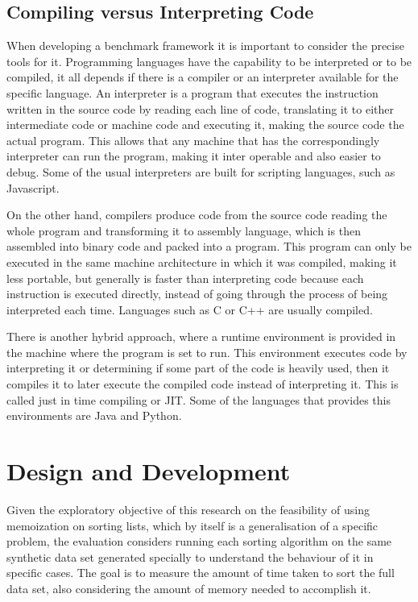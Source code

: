 \documentclass[a4paper,12pt]{article}
\begin{document}
\subsection{Compiling versus Interpreting Code}
When developing a benchmark framework it is important to consider the precise tools for it. Programming languages have the capability to be interpreted or to be compiled, it all depends if there is a compiler or an interpreter available for the specific language. An interpreter is a program that executes the instruction written in the source code by reading each line of code, translating it to either intermediate code or machine code and executing it, making the source code the actual program. This allows that any machine that has the correspondingly interpreter can run the program, making it inter operable and also easier to debug. Some of the usual interpreters are built for scripting languages, such as Javascript.

On the other hand, compilers produce code from the source code reading the whole program and transforming it to assembly language, which is then assembled into binary code and packed into a program. This program can only be executed in the same machine architecture in which it was compiled, making it less portable, but generally is faster than interpreting code because each instruction is executed directly, instead of going through the process of being interpreted each time. Languages such as C or C++ are usually compiled.

There is another hybrid approach, where a runtime environment is provided in the machine where the program is set to run. This environment executes code by interpreting it or determining if some part of the code is heavily used, then it compiles it to later execute the compiled code instead of interpreting it. This is called  just in time compiling or JIT. Some of the languages that provides this environments are Java and Python.

\section{Design and Development}
Given the exploratory objective of this research on the feasibility of using memoization on sorting lists, which by itself is a generalisation of a specific problem, the evaluation considers running each sorting algorithm on the same synthetic data set generated specially to understand the behaviour of it in specific cases. The goal is to measure the amount of time taken to sort the full data set, also considering the amount of memory needed to accomplish it.
\end{document}
